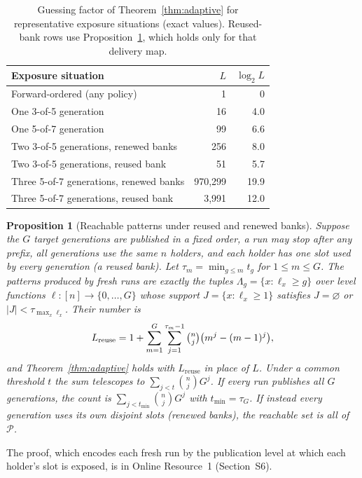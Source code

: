 \documentclass[pdflatex,sn-mathphys-num]{sn-jnl}%
\theoremstyle{plain}
\newtheorem{proposition}[theorem]{Proposition}
\theoremstyle{definition}
\begin{document}
\begin{table}[htbp]
\caption{Guessing factor of Theorem~\ref{thm:adaptive} for representative exposure situations (exact values). Reused-bank rows use Proposition~\ref{prop:patterns}, which holds only for that delivery map.}\label{tab:guess}
\centering\footnotesize
\begin{tabularx}{\linewidth}{@{}>{\raggedright\arraybackslash}Xrr@{}}\toprule
Exposure situation & $L$ & $\log_2L$\\\midrule
Forward-ordered (any policy) & 1 & 0\\
One 3-of-5 generation & 16 & 4.0\\
One 5-of-7 generation & 99 & 6.6\\
Two 3-of-5 generations, renewed banks & 256 & 8.0\\
Two 3-of-5 generations, reused bank & 51 & 5.7\\
Three 5-of-7 generations, renewed banks & 970,299 & 19.9\\
Three 5-of-7 generations, reused bank & 3,991 & 12.0\\\bottomrule
\end{tabularx}
\end{table}

\begin{proposition}[Reachable patterns under reused and renewed banks]\label{prop:patterns}
Suppose the $G$ target generations are published in a fixed order, a run may stop after any prefix, all generations use the same $n$ holders, and each holder has one slot used by every generation (a reused bank). Let $\tau_m=\min_{g\le m}t_g$ for $1\le m\le G$. The patterns produced by fresh runs are exactly the tuples $\Lambda_g=\{x:\ell_x\ge g\}$ over level functions $\ell:[n]\to\{0,\dots,G\}$ whose support $J=\{x:\ell_x\ge1\}$ satisfies $J=\varnothing$ or $|J|<\tau_{\max_x\ell_x}$. Their number is
\[
 L_{\mathrm{reuse}}=1+\sum_{m=1}^{G}\sum_{j=1}^{\tau_m-1}\tbinom nj\big(m^j-(m-1)^j\big),
\]
and Theorem~\ref{thm:adaptive} holds with $L_{\mathrm{reuse}}$ in place of $L$. Under a common threshold $t$ the sum telescopes to $\sum_{j<t}\binom njG^j$. If every run publishes all $G$ generations, the count is $\sum_{j<t_{\min}}\binom njG^j$ with $t_{\min}=\tau_G$. If instead every generation uses its own disjoint slots (renewed banks), the reachable set is all of $\mathcal P$.
\end{proposition}
The proof, which encodes each fresh run by the publication level at which each holder's slot is exposed, is in Online Resource~1 (Section~S6).
\end{document}
